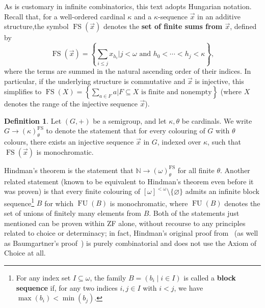 \documentclass[10pt,a4paper]{amsart}
\theoremstyle{definition}
\newtheorem{definition}[theorem]{Definition}
\theoremstyle{remark}
\numberwithin{equation}{section}
\begin{document}
As is customary in infinite combinatorics, this text adopts Hungarian notation. Recall that, for a well-ordered cardinal $\kappa$ and a $\kappa$-sequence $\vec{x}$ in an additive structure,\linebreak the symbol $\operatorname{FS}(\vec{x})$ denotes the {\bf set of finite sums from $\vec{x}$},
defined by
\begin{equation*}
    \operatorname{FS}(\vec{x})=\left\{\sum_{i\leq j}x_{h_{i}}\big|j<\omega\text{ and }h_{0}<\cdots<h_{j}<\kappa\right\},
\end{equation*}
where the terms are summed in the natural ascending order of their indices.\linebreak
In particular, if the underlying structure is commutative and $\vec{x}$ is injective, this simplifies to $\operatorname{FS}(X)=\left\{\sum_{a\in F}a\big|F\subseteq X\text{ is finite and nonempty}\right\}$ (where $X$ denotes the range of the injective sequence $\vec{x}$).

\begin{definition} \label{def:hindman-property}
Let $(G,+)$ be a semigroup, and let $\kappa,\theta$ be cardinals.\linebreak 
We write $G\to(\kappa)^{\operatorname{FS}}_{\theta}$ to denote the statement that for every colouring of $G$ with $\theta$ colours, there exists an injective sequence $\vec{x}$ in $G$, indexed over $\kappa$, such that $\operatorname{FS}(\vec{x})$ is monochromatic.%
\end{definition}

Hindman's theorem \cite{Hindman1974} is the statement that $\mathbb N\to(\omega)^{\operatorname{FS}}_{\theta}$ for all finite $\theta$. Another related statement (known to be equivalent to Hindman's theorem even before it was proven) is that every finite colouring of $[\omega]^{<\omega}\setminus\{\varnothing\}$ admits an infinite block sequence\footnote{For any index set $I\subseteq\omega$, the family $B=(b_{i}\mid i\in I)$ is called a {\bf block sequence} if, for any two indices $i, j\in I$ with $i<j$, we have $\max(b_{i})<\min(b_{j})$.} $B$ for which $\operatorname{FU}(B)$ is monochromatic, where $\operatorname{FU}(B)$ denotes the set of unions of finitely many elements from $B$. Both of the statements just mentioned can be proven within ZF alone, without recourse to any principles related to choice or determinacy; in fact, Hindman's original proof from~\cite{Hindman1974} (as well as Baumgartner's proof~\cite{Baumgartner1974}) is purely combinatorial and does not use the Axiom of Choice at all.
\end{document}

